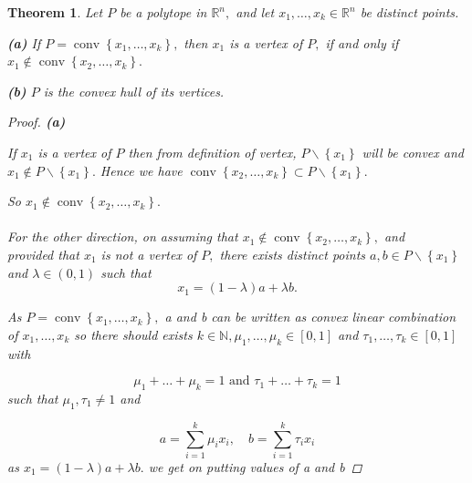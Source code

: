 \documentclass[oneside]{book}
\newtheorem{theorem}{Theorem}[section]
\begin{document}
	
	
	
	
	
	
	
	
	
	
	\begin{theorem}
		\label{t:6}
		Let $P$ be a polytope in $\mathbb{R}^{n},$ and let $x_{1}, \ldots, x_{k} \in \mathbb{R}^{n}$ be distinct points.\par
		\textbf{(a)} If $P=\operatorname{conv}\left\{x_{1}, \ldots, x_{k}\right\},$ then $x_{1}$ is a vertex of $P,$ if and only if $x_{1} \notin \operatorname{conv}\left\{x_{2}, \ldots, x_{k}\right\}.$ \par
		\textbf{(b)} $P$ is the convex hull of its vertices.
		\\
		
		\begin{proof}
			
			\textbf{(a)}  \par 
			
			
			If  $x_{1}$ is a vertex of $P $ then  from definition of vertex, $P \backslash\left\{x_{1}\right\}$ will be convex and $x_{1} \notin P \backslash\left\{x_{1}\right\} .$ Hence we have  $\operatorname{conv}\left\{x_{2}, \ldots, x_{k}\right\} \subset P \backslash\left\{x_{1}\right\}.$ 
			\par 
			So  $x_{1} \notin \operatorname{conv}\left\{x_{2}, \ldots, x_{k}\right\}.$ 
			\\\\
			For the other direction, on assuming that $x_{1} \notin \operatorname{conv}\left\{x_{2}, \ldots, x_{k}\right\}, $ and \\
			provided that  $x_{1}$ is not a vertex of $P,$ there exists distinct points $a, b \in P \backslash\left\{x_{1}\right\}$ and $\lambda \in(0,1)$ such that
			$$x_{1}=(1-\lambda) a+\lambda b .$$ 
			
			As  $P=\operatorname{conv}\left\{x_{1}, \ldots, x_{k}\right\},$ a and b can be written as convex linear combination of $x_{1},\ldots ,x_{k} $   so there should exists $k \in \mathbb{N}, \mu_{1}, \ldots, \mu_{k} \in[0,1]$ and $\tau_{1}, \ldots, \tau_{k} \in[0,1]$ with
			
			$$\mu_{1}+\ldots+\mu_{k}=1 \text{ and } \tau_{1}+\ldots+\tau_{k}=1 $$
			such that $\mu_{1}, \tau_{1} \neq 1$ and \par
			\begin{equation}
				\label{eq37}
				a=\sum_{i=1}^{k} \mu_{i} x_{i}, \quad b=\sum_{i=1}^{k} \tau_{i} x_{i}
			\end{equation}  
			as $x_{1}=(1-\lambda) a+\lambda b .$ we get on putting values of a and b 
			

\end{proof}
\end{theorem}
\end{document}
